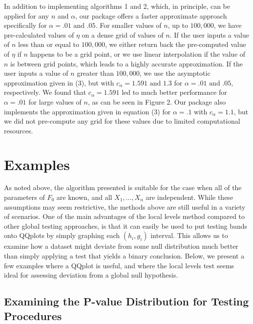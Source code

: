\documentclass[article]{jss}
\begin{document}
\newline
\newline
In addition to implementing algorithms 1 and 2, which, in principle, can be applied for any $n$ and $\alpha$, our package offers a faster approximate approach specifically for $\alpha = .01 \textrm{ and } .05$. For smaller values of $n$, up to $100,000$, we have pre-calculated values of $\eta$ on a dense grid of values of $n$. If the user inputs a value of $n$ less than or equal to $100,000$, we either return back the pre-computed value of $\eta$ if $n$ happens to be a grid point, or we use linear interpolation if the value of $n$ is between grid points, which leads to a highly accurate approximation. If the user inputs a value of $n$ greater than $100,000$, we use the asymptotic approximation given in (3), but with $c_{\alpha} = 1.591 \textrm{ and } 1.3$ for $\alpha = .01 \textrm{ and } .05$, respectively. We found that $c_{\alpha} = 1.591$ led to much better performance for $\alpha = .01$ for large values of $n$, as can be seen in Figure 2. Our package also implements the approximation given in equation (3) for $\alpha = .1$ with $c_{\alpha} = 1.1$, but we did not pre-compute any grid for these values due to limited computational resources.
\section{Examples}
As noted above, the algorithm presented is suitable for the case when all of the parameters of $F_{0}$ are known, and all $X_{1}, ..., X_{n}$ are independent. While these assumptions may seem restrictive, the methods above are still useful in a variety of scenarios.
\newline
\newline
One of the main advantages of the local levels method compared to other global testing approaches, is that it can easily be used to put testing bands onto QQplots by simply graphing each $(h_{i}, g_{i})$ interval. This allows us to examine how a dataset might deviate from some null distribution much better than simply applying a test that yields a binary conclusion. Below, we present a few examples where a QQplot is useful, and where the local levels test seems ideal for assessing deviation from a global null hypothesis.

\subsection{Examining the P-value Distribution for Testing Procedures}
\end{document}
